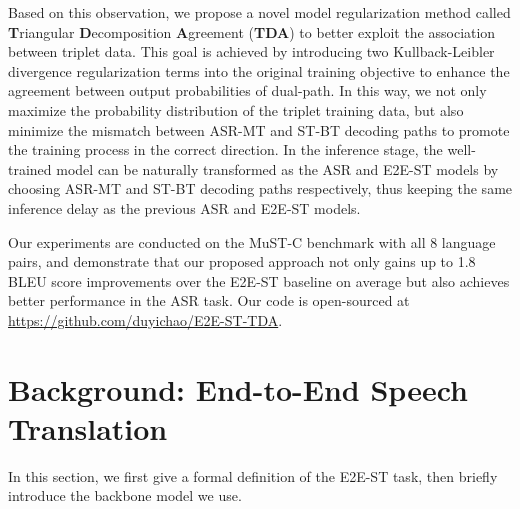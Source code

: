 \documentclass[letterpaper]{article} %
\begin{document}
Based on this observation, we propose a novel model regularization method called \textbf{T}riangular \textbf{D}ecomposition \textbf{A}greement (\textbf{TDA}) to better exploit the association between triplet data.
This goal is achieved by introducing two Kullback-Leibler divergence regularization terms into the original training objective to enhance the agreement between output probabilities of dual-path.
In this way, we not only maximize the probability distribution of the triplet training data, but also minimize the mismatch between ASR-MT and ST-BT decoding paths to promote the training process in the correct direction. 
In the inference stage, the well-trained model can be naturally transformed as the ASR and E2E-ST models by choosing ASR-MT and ST-BT decoding paths respectively, thus keeping the same inference delay as the previous ASR and E2E-ST models.

Our experiments are conducted on the MuST-C benchmark with all 8 language pairs, and demonstrate that our proposed approach not only gains up to 1.8 BLEU score improvements over the E2E-ST baseline on average but also achieves better performance in the ASR task. Our code is open-sourced at \url{https://github.com/duyichao/E2E-ST-TDA}.


\section{Background: End-to-End Speech Translation}
In this section, we first give a formal definition of the E2E-ST task, then briefly introduce the backbone model we use.
\end{document}
